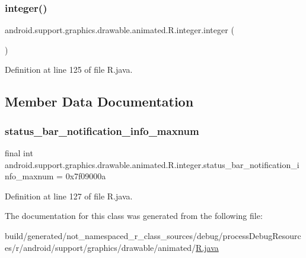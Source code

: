 \subsubsection{\texorpdfstring{integer()}{integer()}}
{\footnotesize\ttfamily android.\+support.\+graphics.\+drawable.\+animated.\+R.\+integer.\+integer (\begin{DoxyParamCaption}{ }\end{DoxyParamCaption})\hspace{0.3cm}{\ttfamily [private]}}



Definition at line 125 of file R.\+java.


\begin{DoxyCode}{0}

\end{DoxyCode}


\subsection{Member Data Documentation}
\mbox{\label{classandroid_1_1support_1_1graphics_1_1drawable_1_1animated_1_1_r_1_1integer_a60aefdee6a7431a6f35a15a0bb57537b}} 
\subsubsection{\texorpdfstring{status\_bar\_notification\_info\_maxnum}{status\_bar\_notification\_info\_maxnum}}
{\footnotesize\ttfamily final int android.\+support.\+graphics.\+drawable.\+animated.\+R.\+integer.\+status\+\_\+bar\+\_\+notification\+\_\+info\+\_\+maxnum = 0x7f09000a\hspace{0.3cm}{\ttfamily [static]}}



Definition at line 127 of file R.\+java.



The documentation for this class was generated from the following file\+:\begin{DoxyCompactItemize}
\item 
build/generated/not\+\_\+namespaced\+\_\+r\+\_\+class\+\_\+sources/debug/process\+Debug\+Resources/r/android/support/graphics/drawable/animated/\mbox{\hyperlink{android_2support_2graphics_2drawable_2animated_2_r_8java}{R.\+java}}\end{DoxyCompactItemize}
